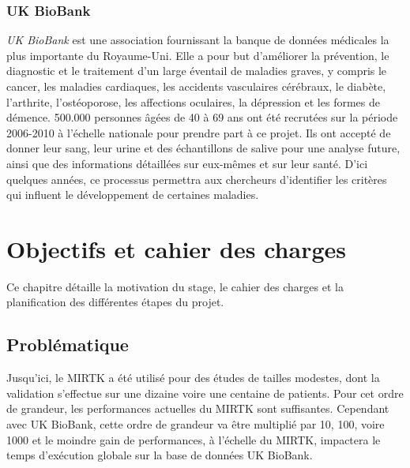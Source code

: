 \documentclass[10pt]{report}
\begin{document}
	 \subsection{UK BioBank}

	 \textit{UK BioBank} est une association fournissant la banque de données médicales la plus importante du Royaume-Uni. Elle a pour but d'améliorer la prévention, le diagnostic et le traitement d'un large éventail de maladies graves, y compris le cancer, les maladies cardiaques, les accidents vasculaires cérébraux, le diabète, l'arthrite, l'ostéoporose, les affections oculaires, la dépression et les formes de démence. 500.000 personnes âgées de 40 à 69 ans ont été recrutées sur la période 2006-2010 à l'échelle nationale pour prendre part à ce projet. Ils ont accepté de donner leur sang, leur urine et des échantillons de salive pour une analyse future, ainsi que des informations détaillées sur eux-mêmes et sur leur santé. D'ici quelques années, ce processus permettra aux chercheurs d'identifier les critères qui influent le développement de certaines maladies.
	 
	 
	 
\chapter{Objectifs et cahier des charges}
	Ce chapitre détaille la motivation du stage, le cahier des charges et la planification des différentes étapes du projet.
	\section{Problématique} 
	Jusqu'ici, le MIRTK a été utilisé pour des études de tailles modestes, dont la validation s'effectue sur une dizaine voire une centaine de patients. Pour cet ordre de grandeur, les performances actuelles du MIRTK sont suffisantes. Cependant avec UK BioBank, cette ordre de grandeur va être multiplié par 10, 100, voire 1000 et le moindre gain de performances, à l'échelle du MIRTK, impactera le temps d'exécution globale sur la base de données UK BioBank.\\ ~\par
	
\end{document}
